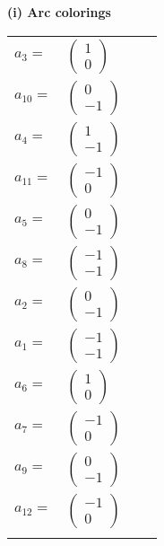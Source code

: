 \documentclass[1p]{elsarticle_modified}
\theoremstyle{definition}
\begin{document}
\flushleft \textbf{(i) Arc colorings}\\
\begin{tabular}{m{7pt} m{180pt} m{7pt} m{180pt} }
\flushright $a_{3}=$&$\begin{pmatrix}1\\0\end{pmatrix}$ \\
\flushright $a_{10}=$&$\begin{pmatrix}0\\-1\end{pmatrix}$ \\
\flushright $a_{4}=$&$\begin{pmatrix}1\\-1\end{pmatrix}$ \\
\flushright $a_{11}=$&$\begin{pmatrix}-1\\0\end{pmatrix}$ \\
\flushright $a_{5}=$&$\begin{pmatrix}0\\-1\end{pmatrix}$ \\
\flushright $a_{8}=$&$\begin{pmatrix}-1\\-1\end{pmatrix}$ \\
\flushright $a_{2}=$&$\begin{pmatrix}0\\-1\end{pmatrix}$ \\
\flushright $a_{1}=$&$\begin{pmatrix}-1\\-1\end{pmatrix}$ \\
\flushright $a_{6}=$&$\begin{pmatrix}1\\0\end{pmatrix}$ \\
\flushright $a_{7}=$&$\begin{pmatrix}-1\\0\end{pmatrix}$ \\
\flushright $a_{9}=$&$\begin{pmatrix}0\\-1\end{pmatrix}$ \\
\flushright $a_{12}=$&$\begin{pmatrix}-1\\0\end{pmatrix}$\\&\end{tabular}
\end{document}
